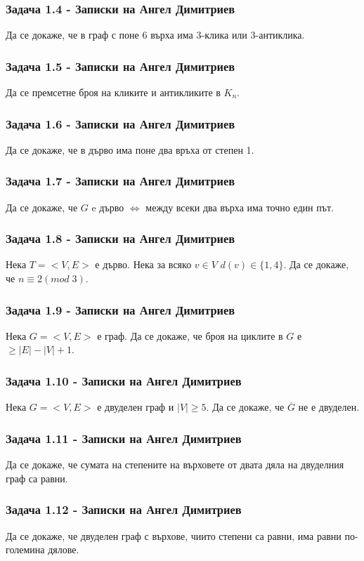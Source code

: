 \documentclass[12pt]{article}
\begin{document}
\subsubsection*{Задача 1.4 - Записки на Ангел Димитриев}
Да се докаже, че в граф с поне 6 върха има 3-клика или 3-антиклика.
\subsubsection*{Задача 1.5 - Записки на Ангел Димитриев}
Да се премсетне броя на кликите и антикликите в $K_n$.
\subsubsection*{Задача 1.6 - Записки на Ангел Димитриев}
Да се докаже, че в дърво има поне два връха от степен 1. 
\subsubsection*{Задача 1.7 - Записки на Ангел Димитриев}
Да се докаже, че $G$ e дърво $\iff$ между всеки два върха има точно един път.
\subsubsection*{Задача 1.8 - Записки на Ангел Димитриев}
Нека $T = <V, E>$ е дърво. Нека за всяко $v \in V$ $d(v) \in \{ 1, 4\}$. Да се докаже, че $n \equiv 2 (mod \; 3)$.
\subsubsection*{Задача 1.9 - Записки на Ангел Димитриев}
Нека $G = <V, E>$ е граф. Да се докаже, че броя на циклите в $G$ е $\geq |E| - |V| + 1$.
\subsubsection*{Задача 1.10 - Записки на Ангел Димитриев}
Нека $G = <V, E>$ е двуделен граф и $|V| \geq 5$. Да се докаже, че $\overline{G}$ не е двуделен.
\subsubsection*{Задача 1.11 - Записки на Ангел Димитриев}
Да се докаже, че сумата на степените на върховете от двата дяла на двуделния граф са равни.
\subsubsection*{Задача 1.12 - Записки на Ангел Димитриев}
Да се докаже, че двуделен граф с върхове, чиито степени са равни, има равни по-големина дялове.
\end{document}
